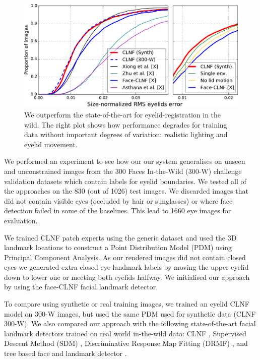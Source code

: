 \begin{figure}
    \centering
    \includegraphics[width=\columnwidth]{figs/CLNF_300W_experiment.pdf}
    \caption{We outperform the state-of-the-art for eyelid-registration in the wild. The right plot shows how performance degrades for training data without important degrees of variation: realistic lighting and eyelid movement.}
    \label{fig:clnf_results_wild}
\end{figure}

% 

We performed an experiment to see how our our system generalises on unseen and unconstrained images from the 300 Faces In-the-Wild (300-W) challenge \cite{sagonas2013300} validation datasets which contain labels for eyelid boundaries. We tested all of the approaches on the 830 (out of 1026) test images. We discarded images that did not contain visible eyes (occluded by hair or sunglasses) or where face detection failed in some of the baselines. This lead to 1660 eye images for evaluation.

We trained CLNF patch experts using the generic \dataset dataset and used the 3D landmark locations to construct a Point Distribution Model (PDM) using Principal Component Analysis. 
As our rendered images did not contain closed eyes we generated extra closed eye landmark labels by moving the upper eyelid down to lower one or meeting both eyelids halfway.
We initialised our approach by using the face-CLNF \cite{baltrusaitis2013constrained} facial landmark detector.

To compare using synthetic or real training images, we trained an eyelid CLNF model on 300-W images, but used the same PDM used for synthetic data (CLNF 300-W).
We also compared our approach with the following state-of-the-art facial landmark detectors trained on real world in-the-wild data: CLNF \cite{baltrusaitis2013constrained}, Supervised Descent Method (SDM) \cite{Xiong2013sdm}, Discriminative Response Map Fitting (DRMF) \cite{Asthana2013drmf}, and tree based face and landmark detector \cite{Zhu2012tree}. 

